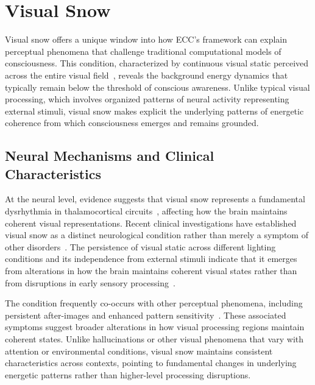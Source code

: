 \section{Visual Snow}

Visual snow offers a unique window into how ECC's framework can explain perceptual phenomena that challenge traditional computational models of consciousness. This condition, characterized by continuous visual static perceived across the entire visual field~\cite{Puledda2020, pinotsis2023cytoelectric}, reveals the background energy dynamics that typically remain below the threshold of conscious awareness. Unlike typical visual processing, which involves organized patterns of neural activity representing external stimuli, visual snow makes explicit the underlying patterns of energetic coherence from which consciousness emerges and remains grounded.

\subsection*{Neural Mechanisms and Clinical Characteristics}

At the neural level, evidence suggests that visual snow represents a fundamental dysrhythmia in thalamocortical circuits~\cite{Lauschke2016, hunt2024electromagnetic}, affecting how the brain maintains coherent visual representations. Recent clinical investigations have established visual snow as a distinct neurological condition rather than merely a symptom of other disorders~\cite{Schankin2014, zheng2025unbearable}. The persistence of visual static across different lighting conditions and its independence from external stimuli indicate that it emerges from alterations in how the brain maintains coherent visual states rather than from disruptions in early sensory processing~\cite{Bessero2014, van2025processes}.

The condition frequently co-occurs with other perceptual phenomena, including persistent after-images and enhanced pattern sensitivity~\cite{Puledda2020, bosl2025dynamical}. These associated symptoms suggest broader alterations in how visual processing regions maintain coherent states. Unlike hallucinations or other visual phenomena that vary with attention or environmental conditions, visual snow maintains consistent characteristics across contexts, pointing to fundamental changes in underlying energetic patterns rather than higher-level processing disruptions.

